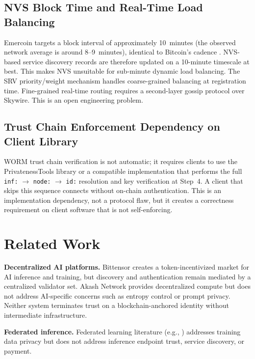 \documentclass[11pt,a4paper]{article}
\theoremstyle{definition}
\begin{document}
\subsection{NVS Block Time and Real-Time Load Balancing}

Emercoin targets a block interval of approximately 10~minutes (the observed
network average is around 8--9~minutes), identical to Bitcoin's cadence
\cite{emercoin}.  NVS-based service discovery records are therefore updated
on a 10-minute timescale at best.  This makes NVS unsuitable for sub-minute
dynamic load balancing.  The SRV priority/weight mechanism handles
coarse-grained balancing at registration time.  Fine-grained real-time
routing requires a second-layer gossip protocol over Skywire.
This is an open engineering problem.

\subsection{Trust Chain Enforcement Dependency on Client Library}

WORM trust chain verification is not automatic; it requires clients to use
the PrivatenessTools library or a compatible implementation that performs
the full \texttt{inf:} $\to$ \texttt{node:} $\to$ \texttt{id:} resolution
and key verification at Step~4.  A client that skips this sequence connects
without on-chain authentication.  This is an implementation dependency, not
a protocol flaw, but it creates a correctness requirement on client software
that is not self-enforcing.

\section{Related Work}
\label{sec:related}

\textbf{Decentralized AI platforms.}  Bittensor \cite{bittensor} creates a
token-incentivized market for AI inference and training, but discovery and
authentication remain mediated by a centralized validator set.  Akash Network
\cite{akash} provides decentralized compute but does not address AI-specific
concerns such as entropy control or prompt privacy.  Neither system terminates
trust on a blockchain-anchored identity without intermediate infrastructure.

\textbf{Federated inference.}  Federated learning literature (e.g.,
\cite{federated}) addresses training data privacy but does not address inference
endpoint trust, service discovery, or payment.
\end{document}
